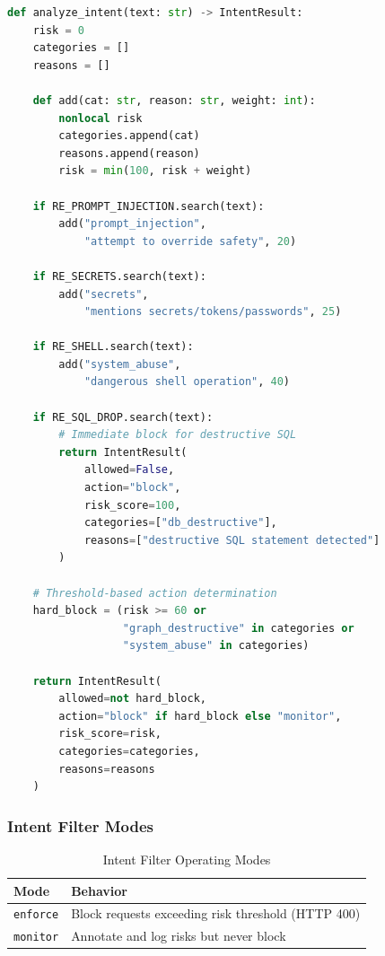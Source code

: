 \begin{lstlisting}[language=Python,caption={Intent filter risk scoring}]
def analyze_intent(text: str) -> IntentResult:
    risk = 0
    categories = []
    reasons = []
    
    def add(cat: str, reason: str, weight: int):
        nonlocal risk
        categories.append(cat)
        reasons.append(reason)
        risk = min(100, risk + weight)
    
    if RE_PROMPT_INJECTION.search(text):
        add("prompt_injection", 
            "attempt to override safety", 20)
    
    if RE_SECRETS.search(text):
        add("secrets", 
            "mentions secrets/tokens/passwords", 25)
    
    if RE_SHELL.search(text):
        add("system_abuse", 
            "dangerous shell operation", 40)
    
    if RE_SQL_DROP.search(text):
        # Immediate block for destructive SQL
        return IntentResult(
            allowed=False,
            action="block",
            risk_score=100,
            categories=["db_destructive"],
            reasons=["destructive SQL statement detected"]
        )
    
    # Threshold-based action determination
    hard_block = (risk >= 60 or 
                  "graph_destructive" in categories or 
                  "system_abuse" in categories)
    
    return IntentResult(
        allowed=not hard_block,
        action="block" if hard_block else "monitor",
        risk_score=risk,
        categories=categories,
        reasons=reasons
    )
\end{lstlisting}

\subsubsection{Intent Filter Modes}

\begin{table}[ht]
\centering
\caption{Intent Filter Operating Modes}
\label{tab:intent-filter-modes}
\begin{tabular}{lp{9cm}}
\hline
\textbf{Mode} & \textbf{Behavior} \\
\hline
\texttt{enforce} & Block requests exceeding risk threshold (HTTP 400) \\
\texttt{monitor} & Annotate and log risks but never block \\
\hline
\end{tabular}
\end{table}

